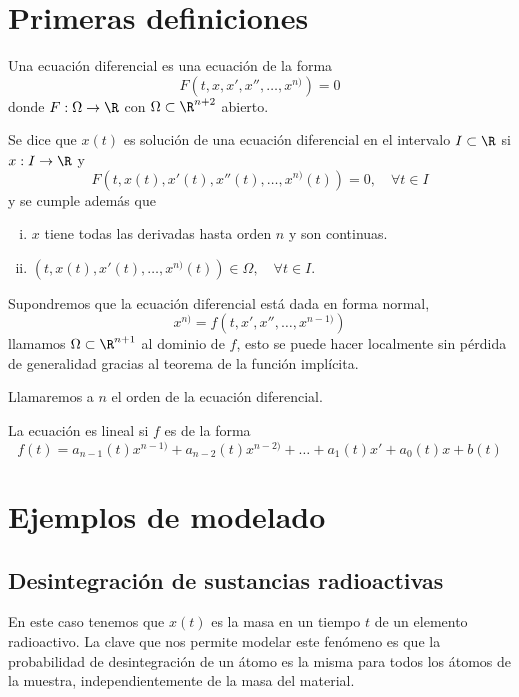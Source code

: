 \documentclass[../main.tex]{subfiles}
\begin{document}
\section{Primeras definiciones}

\begin{definition}
	Una ecuación diferencial es una ecuación de la forma 
	\[F(t, x, x', x'', \dots, x^{n)}) = 0\]
	donde \(F : \Omega \to \R\) con \(\Omega \subset \R^{n + 2}\) abierto.
\end{definition}

Se dice que \(x(t)\) es solución de una ecuación diferencial en el intervalo 
\(I \subset \R\) si \(x : I \to \R\) y
\[F(t, x(t), x'(t), x''(t), \dots, x^{n)}(t)) = 0, \quad \forall t \in I\]
y se cumple además que
\begin{enumerate}[i)]
	\item \(x\) tiene todas las derivadas hasta orden \(n\) y son continuas.
	\item \((t, x(t), x'(t), \dots, x^{n)}(t)) \in \Omega, \quad \forall t \in I\).
\end{enumerate}

Supondremos que la ecuación diferencial está dada en forma normal,
\[x^{n)} = f(t, x', x'', \dots, x^{n - 1)})\]
llamamos \(\Omega \subset \R^{n + 1}\) al dominio de \(f\), esto se puede hacer
localmente sin pérdida de generalidad gracias al teorema de la función
implícita.

\begin{definition}
	Llamaremos a \(n\) el orden de la ecuación diferencial.
\end{definition}

\begin{definition}
	La ecuación es lineal si \(f\) es de la forma
	\[f(t) = a_{n - 1}(t)x^{n - 1)} + a_{n - 2}(t)x^{n - 2)} + 
		\dots + a_1(t)x' + a_0(t)x + b(t)\]
\end{definition}

\section{Ejemplos de modelado}

\subsection{Desintegración de sustancias radioactivas}

En este caso tenemos que \(x(t)\) es
la masa en un tiempo \(t\) de un elemento radioactivo. La clave que nos permite
modelar este fenómeno es que la probabilidad de desintegración de un átomo es la
misma para todos los átomos de la muestra, independientemente de la masa del
material.
\end{document}
